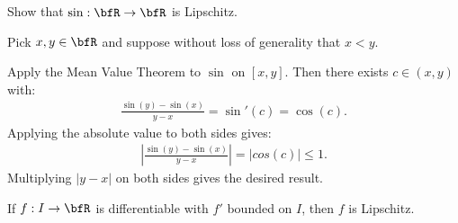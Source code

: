     \begin{example}
        Show that $\sin : \bfR \rightarrow \bfR$ is Lipschitz.
    \end{example}
        \begin{solution}
            Pick $x,y \in \bfR$ and suppose without loss of generality that $x < y$. \nl
            
            Apply the Mean Value Theorem to $\sin$ on $[x,y]$. Then there exists $c \in (x,y)$ with:
                \begin{equation*}
                \begin{split}
                    \frac{\sin(y) - \sin(x)}{y-x} = \sin'(c) = \cos(c).
                \end{split}
                \end{equation*}
            Applying the absolute value to both sides gives:
                \begin{equation*}
                \begin{split}
                    \left|\frac{\sin(y) - \sin(x)}{y-x}\right| = |cos(c)| \leq 1.
                \end{split}
                \end{equation*}
            Multiplying $|y-x|$ on both sides gives the desired result.
        \end{solution}

    \begin{exercise}
        If $f:I \rightarrow \bfR$ is differentiable with $f'$ bounded on $I$, then $f$ is Lipschitz.
    \end{exercise}

    \iffalse
    \begin{example}
        Discuss $\sum_{k = 1}^\infty \sin \left(\frac{1}{k^2}\right)$.
    \end{example}
        \begin{solution}
            Observe that:
                \begin{equation*}
                \begin{split}
                    \sum_k \left|\sin \left(\frac{1}{k^2}\right)\right| \leq \sum_k \frac{1}{k^2}.
                \end{split}
                \end{equation*}
            By comparison, $\sum_{k} \sin \left(\frac{1}{k^2}\right)$ converges absolutely.
        \end{solution}
    \fi
    
